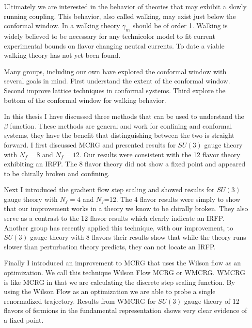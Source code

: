 Ultimately we are interested in the behavior of theories that may exhibit a slowly running coupling.
This behavior, also called walking, may exist just below the conformal window.
In a walking theory $\gamma_m$ should be of order 1.
Walking is widely believed to be necessary for any technicolor model to fit current experimental bounds on flavor changing neutral currents.
To date a viable walking theory has not yet been found.

Many groups, including our own have explored the conformal window with several goals in mind.
First understand the extent of the conformal window.
Second improve lattice techniques in conformal systems.
Third explore the bottom of the conformal window for walking behavior.

In this thesis I have discussed three methods that can be used to understand the $\beta$ function.
These methods are general and work for confining and conformal systems, they have the benefit that distinguishing between the two is straight forward.
I first discussed MCRG and presented results for $SU(3)$ gauge theory with $N_f=8$ and $N_f=12$.
Our results were consistent with the 12 flavor theory exhibiting an IRFP.
The 8 flavor theory did not show a fixed point and appeared to be chirally broken and confining.

Next I introduced the gradient flow step scaling and showed results for $SU(3)$ gauge theory with $N_f=4$ and $N_f$=12.
The 4 flavor results were simply to show that our improvement works in a theory we know to be chirally broken.
They also serve as a contrast to the 12 flavor results which clearly indicate an IRFP.
Another group has recently applied this technique, with our improvement, to $SU(3)$ gauge theory with 8 flavors \cite{} their results show that while the theory runs slower than perturbation theory predicts, they can not locate an IRFP.

Finally I introduced an improvement to MCRG that uses the Wilson flow as an optimization.
We call this technique Wilson Flow MCRG or WMCRG.
WMCRG is like MCRG in that we are calculating the discrete step scaling function.
By using the Wilson Flow as an optimization we are able to probe a single renormalized trajectory.
Results from WMCRG for $SU(3)$ gauge theory of 12 flavors of fermions in the fundamental representation shows very clear evidence of a fixed point.

